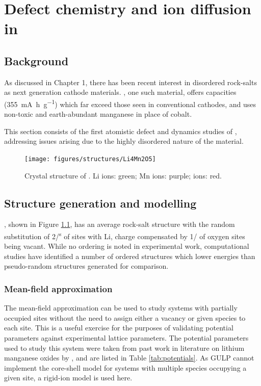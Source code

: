 \chapter{Defect chemistry and  ion diffusion in }
\section{Background}
As discussed in Chapter 1, there has been recent interest in disordered rock-salts as next generation cathode materials.
, one such material, offers capacities (\SI{355}{\milli\ampere\hour\per\gram}) which far exceed those seen in conventional cathodes, and uses non-toxic and earth-abundant manganese in place of cobalt.

This section consists of the first atomistic defect and dynamics studies of , addressing issues arising due to the highly disordered nature of the material.
\newpage
\begin{figure}
\centering
\texttt{[image: figures/structures/Li4Mn2O5]}
\caption[Crystal structure of ]{Crystal structure of . Li ions: green; Mn ions: purple;  ions: red.}
\label{fig:Li4Mn2O5-average}
\end{figure}
\section{Structure generation and modelling}
, shown in Figure \ref{fig:Li4Mn2O5-average}, has an average  rock-salt structure with the random substitution of 2/\textsuperscript{s} of  sites with Li, charge compensated by 1/ of oxygen sites being vacant.
While no ordering is noted in experimental work,\cite{Freire2016,Diaz-Lopez2018a} computational studies have identified a number of ordered structures which lower energies than pseudo-random structures generated for comparison.\cite{Diaz-Lopez2017,Bhandari2019}

\newpage
\subsection{Mean-field approximation}
The mean-field approximation can be used to study systems with partially occupied sites without the need to assign either a vacancy or given species to each site.
This is a useful exercise for the purposes of validating potential parameters against experimental lattice parameters.
The potential parameters used to study this system were taken from past work in literature on lithium manganese oxides by \citet{Ammundsen1999}, and are listed in Table \ref{tab:potentials}.
As GULP cannot implement the core-shell model for systems with multiple species occupying a given site, a rigid-ion model is used here.

